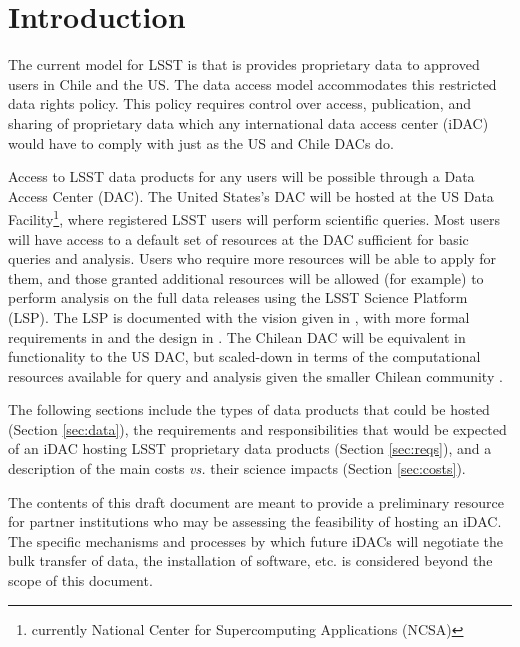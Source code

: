 \section{Introduction}\label{sec:intro}


The current model for LSST is that is provides proprietary data to approved users in Chile and the US. The data access model accommodates this restricted data rights policy. This policy requires control over access, publication, and sharing of proprietary data which any international data access center (iDAC) would have to comply with just as the US and Chile DACs do.

Access to LSST data products for any users will be possible through a Data Access Center (DAC). The United States's DAC will be hosted at the US Data Facility\footnote{currently National Center for Supercomputing Applications (NCSA)},
where registered LSST users will perform scientific queries. Most users will have access to a default set of resources at the DAC sufficient for basic queries and analysis. Users who require more resources will be able to apply for them, and those granted additional resources will be allowed (for example) to perform analysis on the full data releases using the LSST Science Platform (LSP). The LSP is documented with the vision given in , with more formal requirements in  and the design in . The Chilean DAC will be equivalent in functionality to the US DAC, but scaled-down in terms of the computational resources available for query and analysis given the smaller Chilean community .

The following sections include the types of data products that could be hosted (Section \ref{sec:data}), the requirements and responsibilities that would be expected of an iDAC hosting LSST proprietary data products (Section \ref{sec:reqs}), and a description of the main costs {\it vs.} their science impacts (Section \ref{sec:costs}).

The contents of this draft document are meant to provide a preliminary resource for partner institutions who may be assessing the feasibility of hosting an iDAC. The specific mechanisms and processes by which future iDACs will negotiate the bulk transfer of data, the installation of software, etc. is considered beyond the scope of this document.

